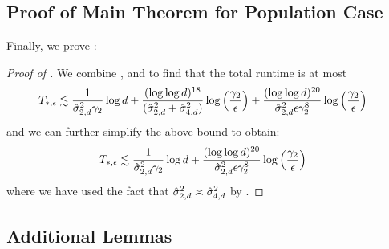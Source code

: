 \subsection{Proof of Main Theorem for Population Case}

Finally, we prove :

\begin{proof}[Proof of ]
We combine ,  and  to find that the total runtime is at most
\begin{align}
T_{*, \epsilon}
& \lesssim 
\frac{1}{\hat{\sigma}_{2, d}^2 \gamma_2} \log d
+ \frac{(\log \log d)^{18}}{(\hat{\sigma}_{2, d}^2 + \hat{\sigma}_{4, d}^2)} \log\Big(\frac{\gamma_2}{\epsilon}\Big)
+ \frac{(\log \log d)^{20}}{\hat{\sigma}_{2, d}^2 \epsilon \gamma_2^8} \log\Big(\frac{\gamma_2}{\epsilon}\Big)
\end{align}
and we can further simplify the above bound to obtain:
\begin{align}
T_{*, \epsilon}
& \lesssim \frac{1}{\hat{\sigma}_{2, d}^2 \gamma_2} \log d + \frac{(\log \log d)^{20}}{\hat{\sigma}_{2, d}^2 \epsilon \gamma_2^8} \log\Big(\frac{\gamma_2}{\epsilon}\Big)
\end{align}
where we have used the fact that $\hat{\sigma}_{2, d}^2 \asymp \hat{\sigma}_{4, d}^2$ by .
\end{proof}

\subsection{Additional Lemmas}

